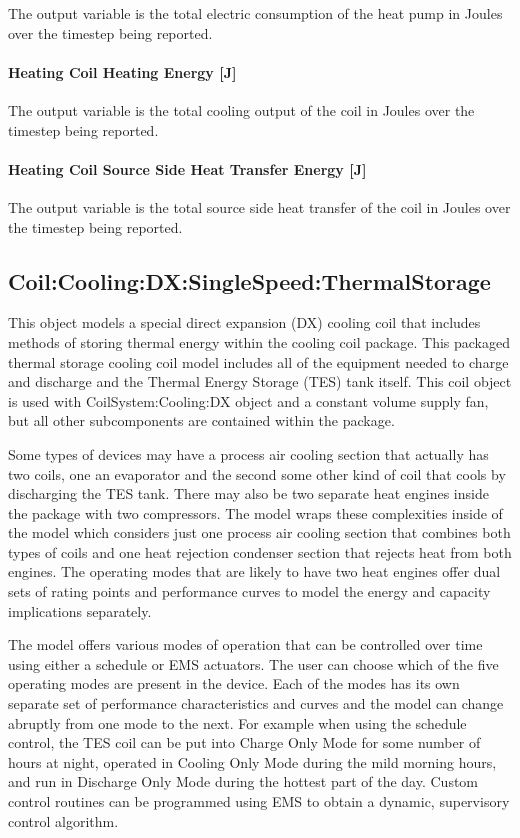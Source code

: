 The output variable is the total electric consumption of the heat pump in Joules over the timestep being reported.

\paragraph{Heating Coil Heating Energy {[}J{]}}\label{heating-coil-heating-energy-j-4}

The output variable is the total cooling output of the coil in Joules over the timestep being reported.

\paragraph{Heating Coil Source Side Heat Transfer Energy {[}J{]}}\label{heating-coil-source-side-heat-transfer-energy-j-3}

The output variable is the total source side heat transfer of the coil in Joules over the timestep being reported.

\subsection{Coil:Cooling:DX:SingleSpeed:ThermalStorage}\label{coilcoolingdxsinglespeedthermalstorage}

This object models a special direct expansion (DX) cooling coil that includes methods of storing thermal energy within the cooling coil package. This packaged thermal storage cooling coil model includes all of the equipment needed to charge and discharge and the Thermal Energy Storage (TES) tank itself. This coil object is used with CoilSystem:Cooling:DX object and a constant volume supply fan, but all other subcomponents are contained within the package.

Some types of devices may have a process air cooling section that actually has two coils, one an evaporator and the second some other kind of coil that cools by discharging the TES tank. There may also be two separate heat engines inside the package with two compressors. The model wraps these complexities inside of the model which considers just one process air cooling section that combines both types of coils and one heat rejection condenser section that rejects heat from both engines. The operating modes that are likely to have two heat engines offer dual sets of rating points and performance curves to model the energy and capacity implications separately.

The model offers various modes of operation that can be controlled over time using either a schedule or EMS actuators. The user can choose which of the five operating modes are present in the device. Each of the modes has its own separate set of performance characteristics and curves and the model can change abruptly from one mode to the next. For example when using the schedule control, the TES coil can be put into Charge Only Mode for some number of hours at night, operated in Cooling Only Mode during the mild morning hours, and run in Discharge Only Mode during the hottest part of the day. Custom control routines can be programmed using EMS to obtain a dynamic, supervisory control algorithm.

